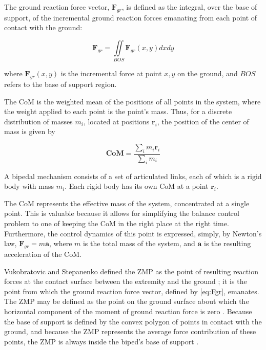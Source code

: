 \documentclass{llncs}
\begin{document}
The ground reaction force vector, $\mathbf{F}_{gr}$, is defined as the integral, over the base of support, of the incremental ground reaction forces emanating from each 
point of contact with the ground:

\begin{equation}
\mathbf{F}_{gr} = \iint\limits_{BOS} \mathbf{F}_{gr} \left( x, y \right) dx dy
\label{eq:Fgr}
\end{equation}

\noindent where $\mathbf{F}_{gr} \left( x, y \right)$ is the incremental force at point $x,y$ on the ground, and $BOS$ refers to the base of support region.

The CoM is the weighted mean of the positions of all points in the system, where the weight applied to each point is the point’s mass.  Thus, for a discrete distribution of masses $m_i$, located at positions $\mathbf{r}_i$, the position of the center of mass is given by

\begin{equation}
\mathbf{CoM} = \frac{\sum_i m_i \mathbf{r}_i}{\sum_i m_i}
\label{eq:CoM}
\end{equation}

\noindent A bipedal mechanism consists of a set of articulated links, each of which is a rigid body with mass $m_i$.
Each rigid body has its own CoM at a point $\mathbf{r}_i$.

The CoM represents the effective mass of the system, concentrated at a single point.  
This is valuable because it allows for simplifying the balance control problem to one of keeping the CoM in the right place at the right time.  
Furthermore, the control dynamics of this point is expressed, simply, by Newton’s law, $\mathbf{F}_{gr} = m \mathbf{a}$, where $m$ is the total
mass of the system, and $\mathbf{a}$ is the resulting acceleration of the CoM.

Vukobratovic and Stepanenko defined the ZMP as the point of resulting reaction forces at the contact surface between the extremity and the ground \cite{vukobratovic1972stability};  
it is the point from which the ground reaction force vector, defined by \ref{eq:Fgr}, emanates.  
The ZMP may be defined as the point on the ground surface about which the horizontal component of the moment of ground reaction force is zero 
\cite{arakawa1997natural, vukobratovic2004zero}.
Because the base of support is defined by the convex polygon of points in contact with the ground, and because the ZMP represents the average force contribution 
of these points, the ZMP is always inside the biped’s base of support \cite{Gos99b}. 
\end{document}
